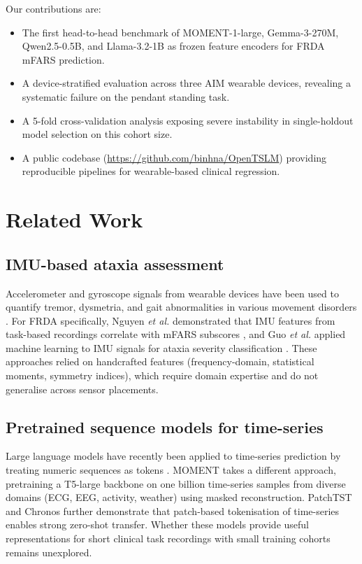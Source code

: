 \documentclass[10pt,twocolumn]{IEEEtran}
\begin{document}
Our contributions are:
\begin{itemize}
  \item The first head-to-head benchmark of MOMENT-1-large,
    Gemma-3-270M, Qwen2.5-0.5B, and Llama-3.2-1B as frozen
    feature encoders for FRDA mFARS prediction.
  \item A device-stratified evaluation across three AIM wearable devices,
    revealing a systematic failure on the pendant standing task.
  \item A 5-fold cross-validation analysis exposing severe
    instability in single-holdout model selection on this cohort size.
  \item A public codebase (\url{https://github.com/binhna/OpenTSLM})
    providing reproducible pipelines for wearable-based clinical regression.
\end{itemize}

\section{Related Work}

\subsection{IMU-based ataxia assessment}
Accelerometer and gyroscope signals from wearable devices have been used
to quantify tremor, dysmetria, and gait abnormalities in various movement
disorders \cite{Mancini2021,Lonini2022,Carignan2020}.
For FRDA specifically, Nguyen \textit{et al.} demonstrated that IMU features
from task-based recordings correlate with mFARS subscores
\cite{Nguyen2021AIM}, and Guo \textit{et al.} applied machine learning to
IMU signals for ataxia severity classification \cite{Guo2023IMU}.
These approaches relied on handcrafted features (frequency-domain,
statistical moments, symmetry indices), which require domain expertise
and do not generalise across sensor placements.

\subsection{Pretrained sequence models for time-series}
Large language models have recently been applied to time-series prediction
by treating numeric sequences as tokens
\cite{Gruver2024LLMTime,Jin2024TimeLLM,Zhou2023OneForAll}.
MOMENT \cite{Goswami2024MOMENT} takes a different approach, pretraining
a T5-large backbone \cite{Raffel2020T5} on one billion time-series samples
from diverse domains (ECG, EEG, activity, weather) using masked reconstruction.
PatchTST \cite{Nie2023PatchTST} and Chronos \cite{Das2024Chronos} further
demonstrate that patch-based tokenisation of time-series enables
strong zero-shot transfer.
Whether these models provide useful representations for short clinical
task recordings with small training cohorts remains unexplored.
\end{document}
